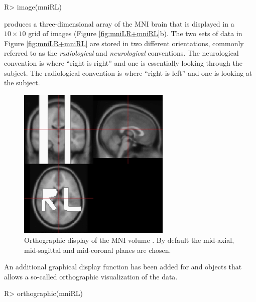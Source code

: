 \documentclass[
]{article}
\begin{document}
\begin{CodeChunk}

\begin{CodeInput}
R> image(mniRL)
\end{CodeInput}
\end{CodeChunk}

produces a three-dimensional array of the MNI brain that is displayed in
a \(10{\times}10\) grid of images (Figure \ref{fig:mniLR+mniRL}b). The
two sets of data in Figure \ref{fig:mniLR+mniRL} are stored in two
different orientations, commonly referred to as the \emph{radiological}
and \emph{neurological} conventions. The neurological convention is
where ``right is right'' and one is essentially looking through the
subject. The radiological convention is where ``right is left'' and one
is looking at the subject.

\begin{figure}[tbp]
  \begin{center}
    \includegraphics*[width=0.65\textwidth]{mniRL_orthographic.jpeg}
    \end{center}
  \caption{Orthographic display of the MNI volume .
    By default the mid-axial, mid-sagittal and mid-coronal planes are
    chosen.}
  \label{fig:mniRL-orthographic}
\end{figure}

An additional graphical display function has been added for 
and  objects that allows a so-called orthographic
visualization of the data.

\begin{CodeChunk}

\begin{CodeInput}
R> orthographic(mniRL)
\end{CodeInput}
\end{CodeChunk}
\end{document}
